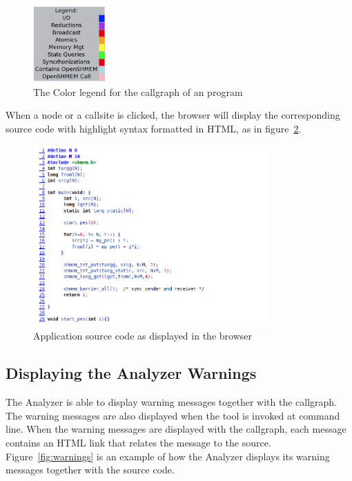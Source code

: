 \begin{figure}[!ht]
  \begin{center}
    \includegraphics[width=0.25\textwidth]{./image006}
    \caption{The Color legend for the callgraph of an \openshmem program}
    \label{fig:colors}
  \end{center}
\end{figure}

When a node or a callsite is clicked, the browser will display the
corresponding source code with highlight syntax formatted in HTML, as
in figure~\ref{fig:app-source}.

\vspace{0.1in}

\begin{figure}[!ht]
  \begin{center}
    \includegraphics[width=0.8\textwidth]{./source_listing_test_bounds}
    \caption{Application source code as displayed in the browser}
    \label{fig:app-source}
  \end{center}
\end{figure}

\subsection{Displaying the \openshmem Analyzer Warnings}

The \openshmem Analyzer is able to display \openshmem warning messages
together with the callgraph. The warning messages are also displayed
when the tool is invoked at command line. When the warning messages
are displayed with the callgraph, each message contains an HTML link
that relates the message to the source. Figure~\ref{fig:warnings} is
an example of how the \openshmem Analyzer displays its warning messages
together with the source code.

